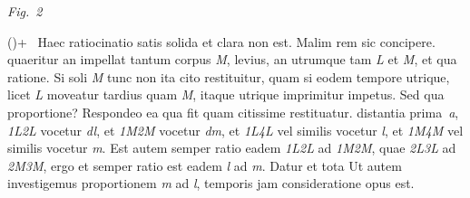   \vspace{0.5em}
  \centerline{\lbrack\textit{Fig.~2}\rbrack}%
  \label{LH_35_09_16_004r_Fig.2}%
%
\vspace{1.5em}
\pstart%
(\protect\vphantom)+~%
Haec ratiocinatio\protect{} satis solida et clara non est.
Malim rem sic concipere. 
%
%
%
quaeritur
an impellat tantum corpus \textit{M},\protect{} levius,
an utrumque tam \textit{L} et \textit{M}, et qua ratione.
Si soli \textit{M}
tunc non ita cito restituitur,\protect{}
quam si eodem tempore utrique,\protect{}
licet \textit{L} moveatur tardius quam \textit{M},
itaque utrique imprimitur impetus.\protect{}
Sed qua proportione?
Respondeo ea qua fit
%
quam citissime restituatur.\protect{}
distantia prima~\textit{a},
\textit{{\scriptsize1}L{\scriptsize2}L} vocetur \textit{dl},
et \textit{{\scriptsize1}M{\scriptsize2}M} vocetur \textit{dm}, %
et \textit{{\scriptsize1}L{\scriptsize4}L} vel similis vocetur \textit{l},
et \textit{{\scriptsize1}M{\scriptsize4}M} vel similis vocetur \textit{m}.
%
%
Est autem semper ratio eadem \textit{{\scriptsize1}L{\scriptsize2}L}
ad \textit{{\scriptsize1}M{\scriptsize2}M},
quae \textit{{\scriptsize2}L{\scriptsize3}L}
ad \textit{{\scriptsize2}M{\scriptsize3}M},
ergo et semper ratio est eadem \textit{l} ad \textit{m}.
Datur et tota
%
Ut autem investigemus proportionem \textit{m} ad \textit{l},
temporis jam consideratione\protect{} opus est.
%
